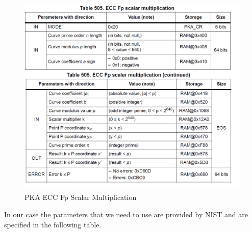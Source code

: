 \begin{figure}[H]
    \centering
    \includegraphics[width=15cm]{img/PKA ECC.png}
    \caption{PKA ECC Fp Scalar Multiplication}
    \label{fig:PKA ECC}
\end{figure}




 In our case the parameters that we need to use are provided by NIST \cite{Nist_curve} and are specified in the following table.

